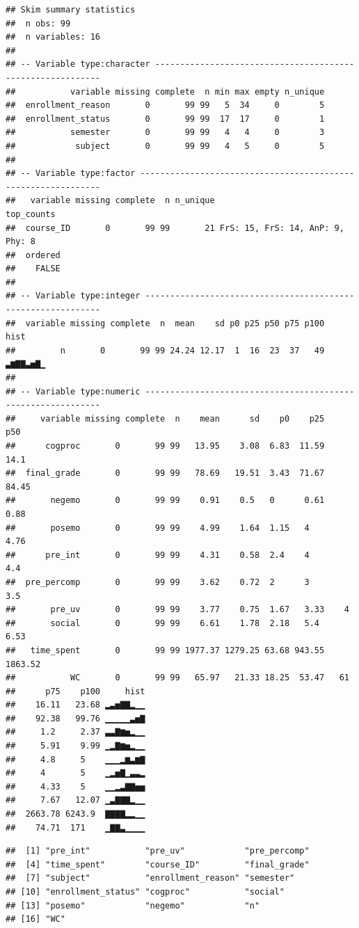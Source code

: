 \documentclass[]{apa6}
\theoremstyle{definition}
\theoremstyle{definition}
\theoremstyle{definition}
\theoremstyle{remark}
\begin{document}
\begin{verbatim}
## Skim summary statistics
##  n obs: 99 
##  n variables: 16 
## 
## -- Variable type:character -----------------------------------------------------------
##           variable missing complete  n min max empty n_unique
##  enrollment_reason       0       99 99   5  34     0        5
##  enrollment_status       0       99 99  17  17     0        1
##           semester       0       99 99   4   4     0        3
##            subject       0       99 99   4   5     0        5
## 
## -- Variable type:factor --------------------------------------------------------------
##   variable missing complete  n n_unique                       top_counts
##  course_ID       0       99 99       21 FrS: 15, FrS: 14, AnP: 9, Phy: 8
##  ordered
##    FALSE
## 
## -- Variable type:integer -------------------------------------------------------------
##  variable missing complete  n  mean    sd p0 p25 p50 p75 p100     hist
##         n       0       99 99 24.24 12.17  1  16  23  37   49 ▃▆▇▇▃▅▇▁
## 
## -- Variable type:numeric -------------------------------------------------------------
##     variable missing complete  n    mean      sd    p0    p25     p50
##      cogproc       0       99 99   13.95    3.08  6.83  11.59   14.1 
##  final_grade       0       99 99   78.69   19.51  3.43  71.67   84.45
##       negemo       0       99 99    0.91    0.5   0      0.61    0.88
##       posemo       0       99 99    4.99    1.64  1.15   4       4.76
##      pre_int       0       99 99    4.31    0.58  2.4    4       4.4 
##  pre_percomp       0       99 99    3.62    0.72  2      3       3.5 
##       pre_uv       0       99 99    3.77    0.75  1.67   3.33    4   
##       social       0       99 99    6.61    1.78  2.18   5.4     6.53
##   time_spent       0       99 99 1977.37 1279.25 63.68 943.55 1863.52
##           WC       0       99 99   65.97   21.33 18.25  53.47   61   
##      p75    p100     hist
##    16.11   23.68 ▂▃▅▇▇▂▁▁
##    92.38   99.76 ▁▁▁▁▁▃▅▇
##     1.2     2.37 ▃▃▇▆▅▂▁▁
##     5.91    9.99 ▁▂▇▆▅▂▁▁
##     4.8     5    ▁▁▁▂▆▃▆▇
##     4       5    ▁▂▅▇▁▃▃▂
##     4.33    5    ▁▁▂▃▇▇▅▅
##     7.67   12.07 ▁▃▇▇▇▂▁▁
##  2663.78 6243.9  ▇▇▇▇▂▂▁▁
##    74.71  171    ▁▇▇▃▁▁▁▁
\end{verbatim}

\begin{verbatim}
##  [1] "pre_int"           "pre_uv"            "pre_percomp"      
##  [4] "time_spent"        "course_ID"         "final_grade"      
##  [7] "subject"           "enrollment_reason" "semester"         
## [10] "enrollment_status" "cogproc"           "social"           
## [13] "posemo"            "negemo"            "n"                
## [16] "WC"
\end{verbatim}
\end{document}
